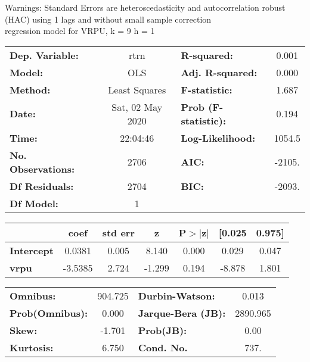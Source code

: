 Warnings: \newline
 [1] Standard Errors are heteroscedasticity and autocorrelation robust (HAC) using 1 lags and without small sample correction\\ 

regression model for VRPU, k = 9 h = 1\begin{center}
\begin{tabular}{lclc}
\toprule
\textbf{Dep. Variable:}    &       rtrn       & \textbf{  R-squared:         } &     0.001   \\
\textbf{Model:}            &       OLS        & \textbf{  Adj. R-squared:    } &     0.000   \\
\textbf{Method:}           &  Least Squares   & \textbf{  F-statistic:       } &     1.687   \\
\textbf{Date:}             & Sat, 02 May 2020 & \textbf{  Prob (F-statistic):} &    0.194    \\
\textbf{Time:}             &     22:04:46     & \textbf{  Log-Likelihood:    } &    1054.5   \\
\textbf{No. Observations:} &        2706      & \textbf{  AIC:               } &    -2105.   \\
\textbf{Df Residuals:}     &        2704      & \textbf{  BIC:               } &    -2093.   \\
\textbf{Df Model:}         &           1      & \textbf{                     } &             \\
\bottomrule
\end{tabular}
\begin{tabular}{lcccccc}
                   & \textbf{coef} & \textbf{std err} & \textbf{z} & \textbf{P$> |$z$|$} & \textbf{[0.025} & \textbf{0.975]}  \\
\midrule
\textbf{Intercept} &       0.0381  &        0.005     &     8.140  &         0.000        &        0.029    &        0.047     \\
\textbf{vrpu}      &      -3.5385  &        2.724     &    -1.299  &         0.194        &       -8.878    &        1.801     \\
\bottomrule
\end{tabular}
\begin{tabular}{lclc}
\textbf{Omnibus:}       & 904.725 & \textbf{  Durbin-Watson:     } &    0.013  \\
\textbf{Prob(Omnibus):} &   0.000 & \textbf{  Jarque-Bera (JB):  } & 2890.965  \\
\textbf{Skew:}          &  -1.701 & \textbf{  Prob(JB):          } &     0.00  \\
\textbf{Kurtosis:}      &   6.750 & \textbf{  Cond. No.          } &     737.  \\
\bottomrule
\end{tabular}
\end{center}


